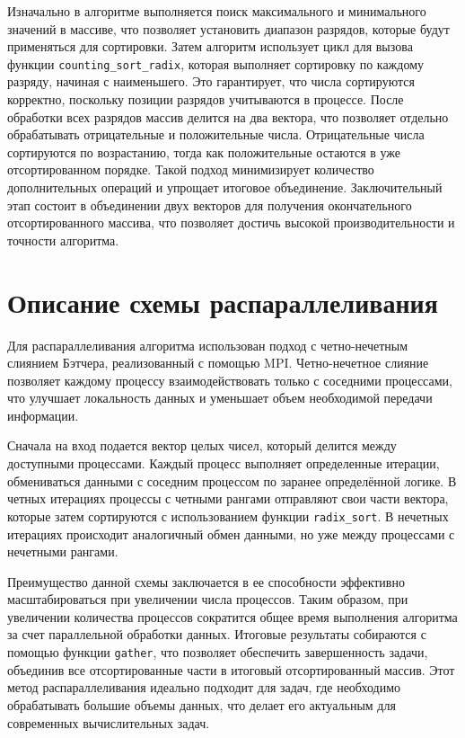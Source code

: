 \documentclass[12pt]{article}
\begin{document}
Изначально в алгоритме выполняется поиск максимального и минимального значений в массиве, что позволяет установить диапазон разрядов, которые будут применяться для сортировки. Затем алгоритм использует цикл для вызова функции \texttt{counting\_sort\_radix}, которая выполняет сортировку по каждому разряду, начиная с наименьшего. Это гарантирует, что числа сортируются корректно, поскольку позиции разрядов учитываются в процессе. После обработки всех разрядов массив делится на два вектора, что позволяет отдельно обрабатывать отрицательные и положительные числа. Отрицательные числа сортируются по возрастанию, тогда как положительные остаются в уже отсортированном порядке. Такой подход минимизирует количество дополнительных операций и упрощает итоговое объединение. Заключительный этап состоит в объединении двух векторов для получения окончательного отсортированного массива, что позволяет достичь высокой производительности и точности алгоритма.

\section{Описание схемы распараллеливания}

Для распараллеливания алгоритма использован подход с четно-нечетным слиянием Бэтчера, реализованный с помощью MPI. Четно-нечетное слияние позволяет каждому процессу взаимодействовать только с соседними процессами, что улучшает локальность данных и уменьшает объем необходимой передачи информации.

Сначала на вход подается вектор целых чисел, который делится между доступными процессами. Каждый процесс выполняет определенные итерации, обмениваться данными с соседним процессом по заранее определённой логике. В четных итерациях процессы с четными рангами отправляют свои части вектора, которые затем сортируются с использованием функции \texttt{radix\_sort}. В нечетных итерациях происходит аналогичный обмен данными, но уже между процессами с нечетными рангами. 

Преимущество данной схемы заключается в ее способности эффективно масштабироваться при увеличении числа процессов. Таким образом, при увеличении количества процессов сократится общее время выполнения алгоритма за счет параллельной обработки данных. Итоговые результаты собираются с помощью функции \texttt{gather}, что позволяет обеспечить завершенность задачи, объединив все отсортированные части в итоговый отсортированный массив. Этот метод распараллеливания идеально подходит для задач, где необходимо обрабатывать большие объемы данных, что делает его актуальным для современных вычислительных задач.
\end{document}
